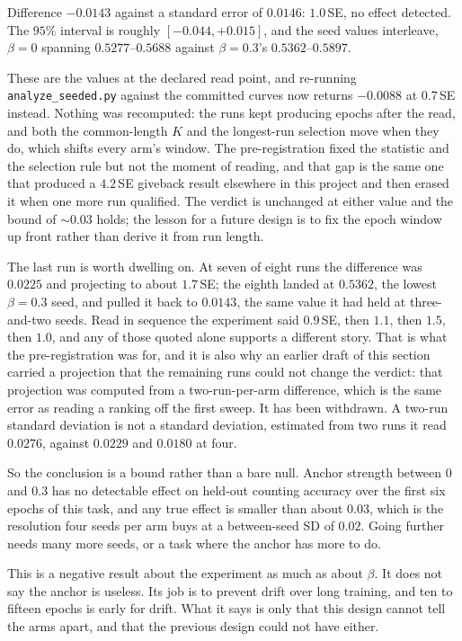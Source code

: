 \documentclass[11pt]{article}
\newcommand{\code}[1]{\texttt{\small #1}}
\begin{document}
\noindent Difference $-0.0143$ against a standard error of $0.0146$: $1.0$\,SE, no effect detected. The $95\%$ interval is roughly $[-0.044, +0.015]$, and the seed values interleave, $\beta{=}0$ spanning $0.5277$--$0.5688$ against $\beta{=}0.3$'s $0.5362$--$0.5897$.

\noindent These are the values at the declared read point, and re-running \code{analyze\_seeded.py} against the committed curves now returns $-0.0088$ at $0.7$\,SE instead. Nothing was recomputed: the runs kept producing epochs after the read, and both the common-length $K$ and the longest-run selection move when they do, which shifts every arm's window. The pre-registration fixed the statistic and the selection rule but not the moment of reading, and that gap is the same one that produced a $4.2$\,SE giveback result elsewhere in this project and then erased it when one more run qualified. The verdict is unchanged at either value and the bound of ${\sim}0.03$ holds; the lesson for a future design is to fix the epoch window up front rather than derive it from run length.

The last run is worth dwelling on. At seven of eight runs the difference was $0.0225$ and projecting to about $1.7$\,SE; the eighth landed at $0.5362$, the lowest $\beta{=}0.3$ seed, and pulled it back to $0.0143$, the same value it had held at three-and-two seeds. Read in sequence the experiment said $0.9$\,SE, then $1.1$, then $1.5$, then $1.0$, and any of those quoted alone supports a different story. That is what the pre-registration was for, and it is also why an earlier draft of this section carried a projection that the remaining runs could not change the verdict: that projection was computed from a two-run-per-arm difference, which is the same error as reading a ranking off the first sweep. It has been withdrawn. A two-run standard deviation is not a standard deviation, estimated from two runs it read $0.0276$, against $0.0229$ and $0.0180$ at four.

So the conclusion is a bound rather than a bare null. Anchor strength between $0$ and $0.3$ has no detectable effect on held-out counting accuracy over the first six epochs of this task, and any true effect is smaller than about $0.03$, which is the resolution four seeds per arm buys at a between-seed SD of $0.02$. Going further needs many more seeds, or a task where the anchor has more to do.

This is a negative result about the experiment as much as about $\beta$. It does not say the anchor is useless. Its job is to prevent drift over long training, and ten to fifteen epochs is early for drift. What it says is only that this design cannot tell the arms apart, and that the previous design could not have either.
\end{document}
